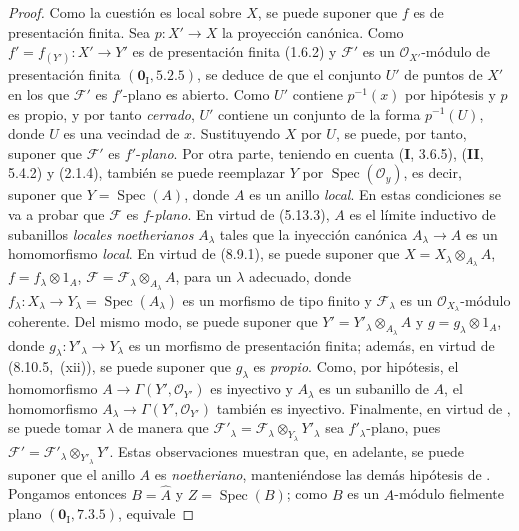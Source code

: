 \begin{proof}
Como la cuestión es local sobre $X$, se puede suponer que $f$ es de presentación finita. Sea
$p:X'\to X$ la proyección canónica. Como
$f'=f_{(Y')}:X'\to Y'$ es de presentación finita
(1.6.2) y $\mathcal F'$ es un $\mathcal O_{X'}$-módulo de presentación finita $(\mathbf 0_{\mathrm I},5.2.5)$, se deduce
de  que el conjunto $U'$ de puntos de $X'$ en los que $\mathcal F'$ es $f'$-plano es abierto. Como $U'$
contiene $p^{-1}(x)$ por hipótesis y $p$ es propio, y por tanto \emph{cerrado}, $U'$ contiene un conjunto de la forma
$p^{-1}(U)$, donde $U$ es una vecindad de $x$. Sustituyendo $X$ por $U$, se puede, por tanto,
suponer que $\mathcal F'$ es $f'$-\emph{plano}. Por otra parte, teniendo en cuenta (\textbf I, 3.6.5), (\textbf{II}, 5.4.2)
y (2.1.4), también se puede reemplazar $Y$ por $\operatorname{Spec}(\mathcal O_y)$, es decir, suponer que $Y=\operatorname{Spec}(A)$,
donde $A$ es un anillo \emph{local}. En estas condiciones se va a probar que $\mathcal F$ es $f$-\emph{plano}. En virtud
de (5.13.3), $A$ es el límite inductivo de subanillos \emph{locales noetherianos} $A_\lambda$ tales que
la inyección canónica $A_\lambda\to A$ es un homomorfismo \emph{local}. En virtud de (8.9.1), se puede suponer que $X=X_\lambda\otimes_{A_\lambda}A$, $f=f_\lambda\otimes1_A$, $\mathcal F=\mathcal F_\lambda\otimes_{A_\lambda}A$,
para un $\lambda$ adecuado, donde $f_\lambda:X_\lambda\to Y_\lambda=\operatorname{Spec}(A_\lambda)$ es un morfismo de tipo finito y
$\mathcal F_\lambda$ es un $\mathcal O_{X_\lambda}$-módulo coherente.
Del mismo modo, se puede suponer que $Y'=Y'_\lambda\otimes_{A_\lambda}A$ y $g=g_\lambda\otimes1_A$, donde $g_\lambda:Y'_\lambda\to Y_\lambda$ es un
morfismo de presentación finita; además, en virtud de (8.10.5,~(xii)), se puede suponer que $g_\lambda$ es
\emph{propio}. Como, por hipótesis, el homomorfismo $A\to\Gamma(Y',\mathcal O_{Y'})$ es inyectivo y $A_\lambda$
es un subanillo de $A$, el homomorfismo $A_\lambda\to\Gamma(Y',\mathcal O_{Y'})$ también es inyectivo. Finalmente,
en virtud de , se puede tomar $\lambda$ de manera que $\mathcal F'_\lambda=\mathcal F_\lambda\otimes_{Y_\lambda}Y'_\lambda$ sea $f'_\lambda$-plano,
pues $\mathcal F'=\mathcal F'_\lambda\otimes_{Y'_\lambda}Y'$. Estas observaciones muestran que, en adelante, se puede suponer que
el anillo $A$ es \emph{noetheriano}, manteniéndose las demás hipótesis de . Pongamos entonces
$B=\widehat A$ y $Z=\operatorname{Spec}(B)$; como $B$ es un $A$-módulo fielmente plano $(\mathbf 0_{\mathrm I},7.3.5)$, equivale

\end{proof}

